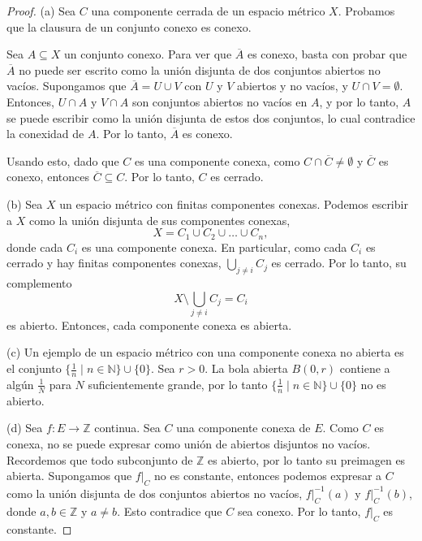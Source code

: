 \begin{proof}
    (a) Sea $C$ una componente cerrada de un espacio métrico $X$. Probamos que la clausura de un conjunto conexo es conexo. 

    Sea $A \subseteq X$ un conjunto conexo. Para ver que $\overline{A}$ es conexo, basta con probar que $\overline{A}$ no puede ser escrito como la unión disjunta de dos conjuntos abiertos no vacíos. Supongamos que $\overline{A} = U \cup V$ con $U$ y $V$ abiertos y no vacíos, y $U \cap V = \emptyset$. Entonces, $U \cap A$ y $V \cap A$ son conjuntos abiertos no vacíos en $A$, y por lo tanto, $A$ se puede escribir como la unión disjunta de estos dos conjuntos, lo cual contradice la conexidad de $A$. Por lo tanto, $\overline{A}$ es conexo.

    Usando esto, dado que $C$ es una componente conexa, como $C \cap \overline{C} \neq \emptyset$ y $\overline{C}$ es conexo, entonces $\overline{C} \subseteq C$. Por lo tanto, $C$ es cerrado.

    (b) Sea $X$ un espacio métrico con finitas componentes conexas. Podemos escribir a $X$ como la unión disjunta de sus componentes conexas,
    \begin{equation*}
        X = C_1 \cup C_2 \cup \dots \cup C_n,
    \end{equation*}
    donde cada $C_i$ es una componente conexa. En particular, como cada $C_i$ es cerrado y hay finitas componentes conexas, $\bigcup_{j \neq i} C_j$ es cerrado. Por lo tanto, su complemento 
    \begin{equation*}
        X \setminus \bigcup_{j \neq i} C_j = C_i
    \end{equation*}
    es abierto. Entonces, cada componente conexa es abierta.

    (c) Un ejemplo de un espacio métrico con una componente conexa no abierta es el conjunto $\{ \frac{1}{n} \mid n \in \mathbb{N} \} \cup \{ 0 \}$. Sea $r > 0$. La bola abierta $B(0, r)$ contiene a algún $\frac{1}{N}$ para $N$ suficientemente grande, por lo tanto $\{ \frac{1}{n} \mid n \in \mathbb{N} \} \cup \{ 0 \}$ no es abierto.
    
    (d) Sea $f : E \to \mathbb{Z}$ continua. Sea $C$ una componente conexa de $E$. Como $C$ es conexa, no se puede expresar como unión de abiertos disjuntos no vacíos. Recordemos que todo subconjunto de $\mathbb{Z}$ es abierto, por lo tanto su preimagen es abierta. Supongamos que $f|_C$ no es constante, entonces podemos expresar a $C$ como la unión disjunta de dos conjuntos abiertos no vacíos, $f|_C^{-1}(a)$ y $f|_C^{-1}(b)$, donde $a, b \in \mathbb{Z}$ y $a \neq b$. Esto contradice que $C$ sea conexo. Por lo tanto, $f|_C$ es constante.
\end{proof}

